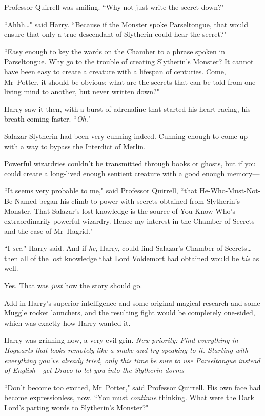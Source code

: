 Professor Quirrell was smiling. ``Why not just write the secret down?"

``Ahhh{\ldots}" said Harry. ``Because if the Monster spoke Parseltongue, that would ensure that only a true descendant of Slytherin could hear the secret?"

``Easy enough to key the wards on the Chamber to a phrase spoken in Parseltongue. Why go to the trouble of creating Slytherin's Monster? It cannot have been easy to create a creature with a lifespan of centuries. Come, Mr~Potter, it should be obvious; what are the secrets that can be told from one living mind to another, but never written down?"

Harry saw it then, with a burst of adrenaline that started his heart racing, his breath coming faster. ``\emph{Oh.}"

Salazar Slytherin had been very cunning indeed. Cunning enough to come up with a way to bypass the Interdict of Merlin.

Powerful wizardries couldn't be transmitted through books or ghosts, but if you could create a long-lived enough sentient creature with a good enough memory—

``It seems very probable to me," said Professor Quirrell, ``that He-Who-Must-Not-Be-Named began his climb to power with secrets obtained from Slytherin's Monster. That Salazar's lost knowledge is the source of You-Know-Who's extraordinarily powerful wizardry. Hence my interest in the Chamber of Secrets and the case of Mr~Hagrid."

``I \emph{see}," Harry said. And if \emph{he}, Harry, could find Salazar's Chamber of Secrets{\ldots} then all of the lost knowledge that Lord Voldemort had obtained would be \emph{his} as well.

Yes. That was \emph{just} how the story should go.

Add in Harry's superior intelligence and some original magical research and some Muggle rocket launchers, and the resulting fight would be completely one-sided, which was exactly how Harry wanted it.

Harry was grinning now, a very evil grin. \emph{New priority: Find everything in Hogwarts that looks remotely like a snake and try speaking to it. Starting with everything you've already tried, only this time be sure to use Parseltongue instead of English—get Draco to let you into the Slytherin dorms—}

``Don't become too excited, Mr~Potter," said Professor Quirrell. His own face had become expressionless, now. ``You must \emph{continue} thinking. What were the Dark Lord's parting words to Slytherin's Monster?"

